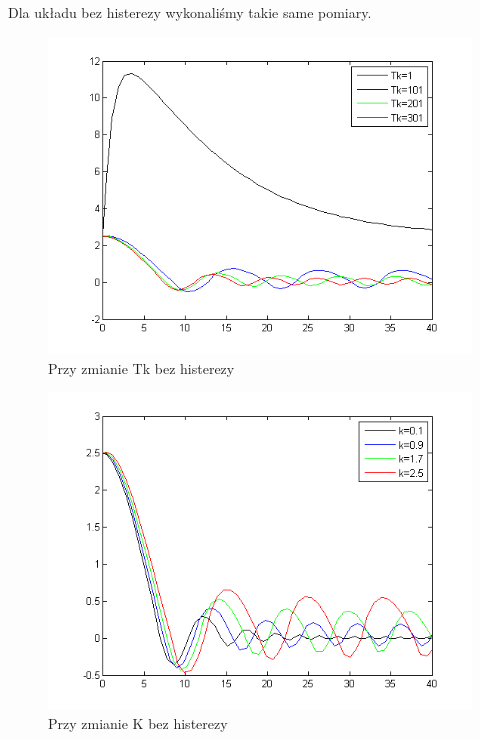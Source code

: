 \documentclass[a4paper,10pt]{article}
\begin{document}
\begin{enumerate}
\newpage
Dla układu bez histerezy wykonaliśmy takie same pomiary.
\begin{figure}[!h]
    \centering
	\includegraphics[width=120mm]{CW3-korekcja-trojpolozeniowyBH-e_Tk.png}
	\caption{Przy zmianie Tk bez histerezy}
    \label{fig:Rysunek}
\end{figure}

\begin{figure}[!h]
    \centering
	\includegraphics[width=120mm]{CW3-korekcja-trojpolozeniowyBH-e_k.png}
	\caption{Przy zmianie K bez histerezy}
    \label{fig:Rysunek}
\end{figure}


\end{enumerate}
\end{document}
